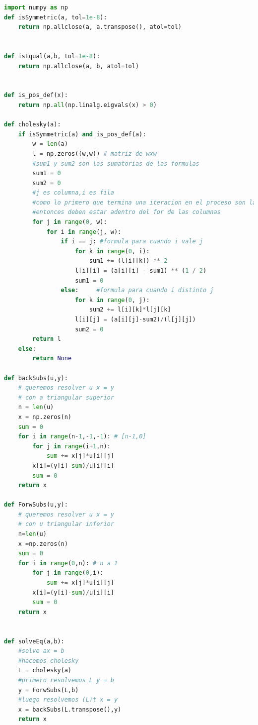 \begin{lstlisting}[language=Python, caption=utils.py]
import numpy as np
def isSymmetric(a, tol=1e-8):
    return np.allclose(a, a.transpose(), atol=tol)


def isEqual(a,b, tol=1e-8):
    return np.allclose(a, b, atol=tol)


def is_pos_def(x):
    return np.all(np.linalg.eigvals(x) > 0)

def cholesky(a):
    if isSymmetric(a) and is_pos_def(a):
        w = len(a)
        l = np.zeros((w,w)) # matriz de wxw
        #sum1 y sum2 son las sumatorias de las formulas
        sum1 = 0
        sum2 = 0
        #j es columna,i es fila
        #como lo primero que termina una iteracion en el proceso son las filas
        #entonces deben estar adentro del for de las columnas
        for j in range(0, w):
            for i in range(j, w):
                if i == j: #formula para cuando i vale j
                    for k in range(0, i):
                        sum1 += (l[i][k]) ** 2
                    l[i][i] = (a[i][i] - sum1) ** (1 / 2)
                    sum1 = 0
                else:     #formula para cuando i distinto j
                    for k in range(0, j):
                        sum2 += l[i][k]*l[j][k]
                    l[i][j] = (a[i][j]-sum2)/(l[j][j])
                    sum2 = 0
        return l
    else:
        return None

def backSubs(u,y):
    # queremos resolver u x = y
    # con a triangular superior
    n = len(u)
    x = np.zeros(n)
    sum = 0
    for i in range(n-1,-1,-1): # [n-1,0]
        for j in range(i+1,n):
            sum += x[j]*u[i][j]
        x[i]=(y[i]-sum)/u[i][i]
        sum = 0
    return x

def ForwSubs(u,y):
    # queremos resolver u x = y
    # con u triangular inferior
    n=len(u)
    x =np.zeros(n)
    sum = 0
    for i in range(0,n): # n a 1
        for j in range(0,i):
            sum += x[j]*u[i][j]
        x[i]=(y[i]-sum)/u[i][i]
        sum = 0
    return x


def solveEq(a,b):
    #solve ax = b
    #hacemos cholesky
    L = cholesky(a)
    #primero resolvemos L y = b
    y = ForwSubs(L,b)
    #luego resolvemos (L)t x = y
    x = backSubs(L.transpose(),y)
    return x
\end{lstlisting}

